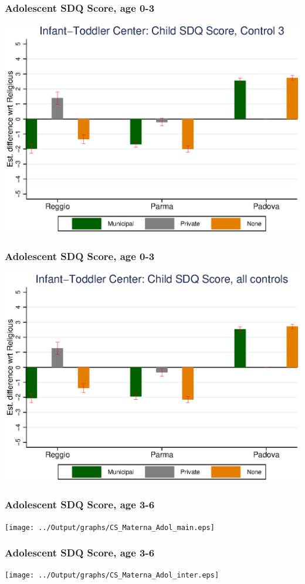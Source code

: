 \documentclass{beamer}
\begin{document}
\begin{frame}\frametitle{Adolescent SDQ Score, age 0-3}
\center
\includegraphics[scale=0.7]{../Output/graphs/CS_Asilo_Adol_right.eps}
\end{frame}

\begin{frame}\frametitle{Adolescent SDQ Score, age 0-3}
\center
\includegraphics[scale=0.7]{../Output/graphs/CS_Asilo_Adol_all.eps}
\end{frame}


\begin{frame}\frametitle{Adolescent SDQ Score, age 3-6}
\center
\texttt{[image: ../Output/graphs/CS\_Materna\_Adol\_main.eps]}
\end{frame}

\begin{frame}\frametitle{Adolescent SDQ Score, age 3-6}
\center
\texttt{[image: ../Output/graphs/CS\_Materna\_Adol\_inter.eps]}
\end{frame}
\end{document}

